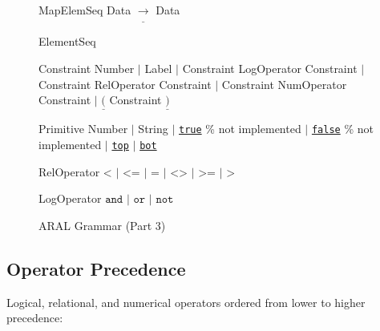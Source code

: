 \documentclass[a4paper,12pt]{report}
\begin{document}
{\begin{figure}[!ht]
\begin{GRAMMAR}
{MapElemSeq}     \>\>\>\>\>\garrow\> Data $\underline{\rightarrow}$ Data 

{ElementSeq}     \>\>\>\>\>\garrow\> 

{Constraint}     \>\>\>\>\>\garrow\> Number
                 \>\>\>\>\> \> $\mid$ Label
                 \>\>\>\>\> \> $\mid$ Constraint LogOperator Constraint
                 \>\>\>\>\> \> $\mid$ Constraint RelOperator Constraint
                 \>\>\>\>\> \> $\mid$ Constraint NumOperator Constraint 
                 \>\>\>\>\> \> $\mid$ $\underline{(}$ Constraint $\underline{)}$ 


{Primitive}      \>\>\>\>\>\garrow\> Number
                 \>\>\>\>\> \>$\mid$ String
                 \>\>\>\>\> \>$\mid$ \underline{\texttt{true}} \% not implemented
                 \>\>\>\>\> \>$\mid$ \underline{\texttt{false}} \% not implemented
                 \>\>\>\>\> \>$\mid$ \underline{\texttt{top}}
                 \>\>\>\>\> \>$\mid$ \underline{\texttt{bot}}

{RelOperator}   \>\>\>\>\>\garrow\> \underline{$\texttt{<}$} $\mid$ \underline{$\texttt{<=}$} $\mid$ \underline{$\texttt{=}$} $\mid$ \underline{$\texttt{<>}$} $\mid$ \underline{$\texttt{>=}$} $\mid$ \underline{$\texttt{>}$}

{LogOperator}   \>\>\>\>\>\garrow\> \underline{$\texttt{and}$} $\mid$ \underline{$\texttt{or}$} $\mid$ \underline{$\texttt{not}$}

\end{GRAMMAR}
\caption{ARAL Grammar (Part 3)}
\label{fig:araltwo}
\end{figure}
}


\subsection{Operator Precedence}

Logical, relational, and numerical operators ordered from lower to higher precedence:
\end{document}
